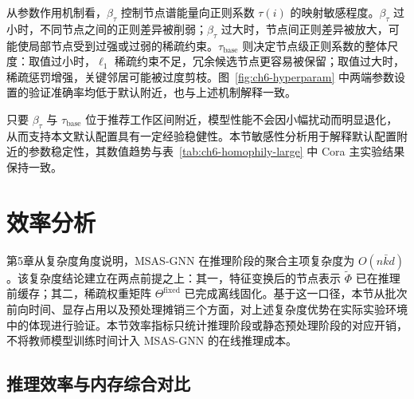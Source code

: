 从参数作用机制看，$\beta_\tau$ 控制节点谱能量向正则系数 $\tau(i)$ 的映射敏感程度。$\beta_\tau$ 过小时，不同节点之间的正则差异被削弱；$\beta_\tau$ 过大时，节点间正则差异被放大，可能使局部节点受到过强或过弱的稀疏约束。$\tau_{\text{base}}$ 则决定节点级正则系数的整体尺度：取值过小时，$\ell_1$ 稀疏约束不足，冗余候选节点更容易被保留；取值过大时，稀疏惩罚增强，关键邻居可能被过度剪枝。图~\ref{fig:ch6-hyperparam} 中两端参数设置的验证准确率均低于默认附近，也与上述机制解释一致。

只要 $\beta_\tau$ 与 $\tau_{\text{base}}$ 位于推荐工作区间附近，模型性能不会因小幅扰动而明显退化，从而支持本文默认配置具有一定经验稳健性。本节敏感性分析用于解释默认配置附近的参数稳定性，其数值趋势与表~\ref{tab:ch6-homophily-large} 中 Cora 主实验结果保持一致。

\section{效率分析}
\label{sec:ch6-efficiency}

第5章从复杂度角度说明，MSAS-GNN 在推理阶段的聚合主项复杂度为 $O(n\bar{k}d)$。该复杂度结论建立在两点前提之上：其一，特征变换后的节点表示 $\tilde{\Phi}$ 已在推理前缓存；其二，稀疏权重矩阵 $\Theta^{\mathrm{fixed}}$ 已完成离线固化。基于这一口径，本节从批次前向时间、显存占用以及预处理摊销三个方面，对上述复杂度优势在实际实验环境中的体现进行验证。本节效率指标只统计推理阶段或静态预处理阶段的对应开销，不将教师模型训练时间计入 MSAS-GNN 的在线推理成本。

\subsection{推理效率与内存综合对比}
\label{subsec:ch6-infer}

